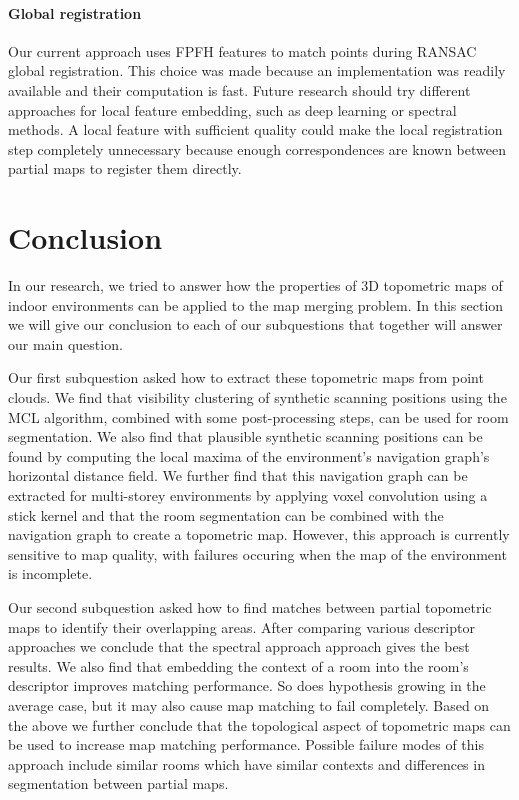 \paragraph{Global registration}
Our current approach uses FPFH features to match points during RANSAC global registration. This choice was made because an implementation was readily available and their computation is fast. Future research should try different approaches for local feature embedding, such as deep learning or spectral methods. A local feature with sufficient quality could make the local registration step completely unnecessary because enough correspondences are known between partial maps to register them directly.



\pagebreak

\section{Conclusion}
In our research, we tried to answer how the properties of 3D topometric maps of indoor environments can be applied to the map merging problem. In this section we will give our conclusion to each of our subquestions that together will answer our main question.

Our first subquestion asked how to extract these topometric maps from point clouds. We find that visibility clustering of synthetic scanning positions using the MCL algorithm, combined with some post-processing steps, can be used for room segmentation. We also find that plausible synthetic scanning positions can be found by computing the local maxima of the environment's navigation graph's horizontal distance field. We further find that this navigation graph can be extracted for multi-storey environments by applying voxel convolution using a stick kernel and that the room segmentation can be combined with the navigation graph to create a topometric map. However, this approach is currently sensitive to map quality, with failures occuring when the map of the environment is incomplete.

Our second subquestion asked how to find matches between partial topometric maps to identify their overlapping areas. After comparing various descriptor approaches we conclude that the spectral approach approach gives the best results. We also find that embedding the context of a room into the room's descriptor improves matching performance. So does hypothesis growing in the average case, but it may also cause map matching to fail completely. Based on the above we further conclude that the topological aspect of topometric maps can be used to increase map matching performance. Possible failure modes of this approach include similar rooms which have similar contexts and differences in segmentation between partial maps.


